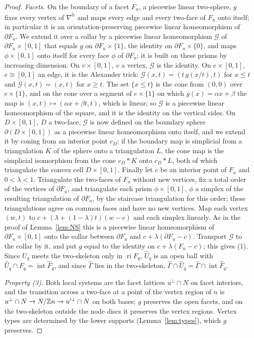 \begin{proof}
\emph{Facets.} On the boundary of a facet $F_u$, a piecewise linear two-sphere, $g$ fixes every vertex of
$\nabla^{\check h}$ and maps every edge and every two-face of $F_u$ onto itself; in particular it is an orientation-preserving
piecewise linear homeomorphism of $\partial F_u$. We extend it over a collar by a piecewise linear homeomorphism $\mathcal G$ of
$\partial F_u\times[0,1]$ that equals $g$ on $\partial F_u\times\{1\}$, the identity on $\partial F_u\times\{0\}$, and maps
$\phi\times[0,1]$ onto itself for every face $\phi$ of $\partial F_u$; it is built on these prisms by increasing dimension. On
$v\times[0,1]$, $v$ a vertex, $\mathcal G$ is the identity. On $e\times[0,1]$, $e\cong[0,1]$ an edge, it is the Alexander
trick: $\mathcal G(x,t)=(t\,g(x/t),t)$ for $x\le t$ and $\mathcal G(x,t)=(x,t)$ for $x\ge t$. The set $\{x\le t\}$ is the cone
from $(0,0)$ over $e\times\{1\}$, and on the cone over a segment of $e\times\{1\}$ on which $g(x)=\alpha x+\beta$ the map is
$(x,t)\mapsto(\alpha x+\beta t,t)$, which is linear; so $\mathcal G$ is a piecewise linear homeomorphism of the square, and it
is the identity on the vertical sides. On $D\times[0,1]$, $D$ a two-face, $\mathcal G$ is now defined on the boundary sphere
$\partial(D\times[0,1])$ as a piecewise linear homeomorphism onto itself, and we extend it by coning from an interior point $c_D$: if the boundary map is simplicial from a
triangulation $K$ of the sphere onto a triangulation $L$, the cone map is the simplicial isomorphism from the cone $c_D*K$ onto
$c_D*L$, both of which triangulate the convex cell $D\times[0,1]$. Finally let $c$ be an interior point of $F_u$ and $0<\lambda<1$. Triangulate the two-faces of $F_u$ without new
vertices, fix a total order of the vertices of $\partial F_u$, and triangulate each prism $\phi\times[0,1]$, $\phi$ a simplex of
the resulting triangulation of $\partial F_u$, by the staircase triangulation for this order; these triangulations agree on
common faces and have no new vertices. Map each vertex $(w,t)$ to $c+(\lambda+(1-\lambda)t)(w-c)$ and each
simplex linearly. As in the proof of Lemma~\ref{lem:NS} this is a piecewise linear homeomorphism of $\partial F_u\times[0,1]$
onto the collar between $\partial F_u$ and $c+\lambda(\partial F_u-c)$. Transport $\mathcal G$ to the collar by it, and put $g$
equal to the identity on $c+\lambda(F_u-c)$; this gives (1). Since $U_q$ meets the two-skeleton only in $\operatorname{ri}F_q$, $\widehat U_q$ is an open ball with
$\widehat U_q\cap F_q=\operatorname{int}\widehat F_q$, and since $\widehat\Gamma$ lies in the two-skeleton,
$\widehat\Gamma\cap\widehat U_q=\widehat\Gamma\cap\operatorname{int}\widehat F_q$.

\emph{Property (3).} Both local systems are the facet lattices $u^\perp\cap N$ on facet interiors, and the transition across
a two-face at a point of the vertex region of $n$ is $u^\perp\cap N\to N/\mathbb Z n\to u'^\perp\cap N$ on both bases; $g$ preserves
the open facets, and on the two-skeleton outside the node discs it preserves the vertex regions. Vertex types are determined
by the lower supports (Lemma~\ref{lem:types}), which $g$ preserves.
\end{proof}

